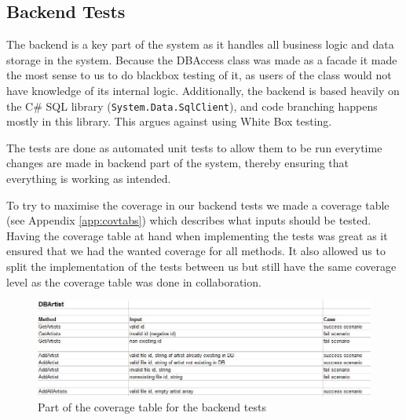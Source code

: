 \subsection{Backend Tests}
The backend is a key part of the system as it handles all business logic and data storage in the system. Because 
the DBAccess class was made as a facade it made the most sense to us to do blackbox testing of it, as users of
the class would not have knowledge of its internal logic. Additionally, the backend is based heavily on the C\#
SQL library (\verb+System.Data.SqlClient+), and code branching happens mostly in this library. This argues against
using White Box testing.

The tests are done as automated unit tests to allow them
to be run everytime changes are made in backend part of the system, thereby ensuring that everything is working as
intended.

To try to maximise the coverage in our backend tests we made a coverage table (see Appendix \ref{app:covtabs}) which
describes what inputs should be tested. Having the coverage table at hand
when implementing the tests was great as it ensured that we had the wanted coverage for all methods. It also allowed us
 to split the implementation of the tests between us but still have the same coverage level as the coverage table was done
 in collaboration.

\begin{figure}[hbt]
	\centering
	\includegraphics[scale=0.52]{./testing/coverage.jpg}
	\caption{Part of the coverage table for the backend tests}
	\label{fig:covtabs}
\end{figure}
  
